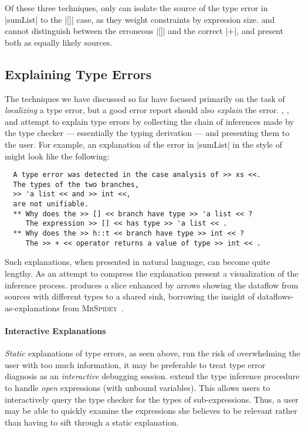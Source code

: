 Of these three techniques, only \citeauthor{Pavlinovic2014-mr} can
isolate the source of the type error in |sumList| to the |[]| case, as
they weight constraints by expression size.
%
\citeauthor{Zhang2015-yu} and \citeauthor{Loncaric2016-uk} cannot
distinguish between the erroneous |[]| and the correct |+|, and present
both as equally likely sources.


\subsection{Explaining Type Errors}
\label{sec:explaining-type-errors}
The techniques we have discussed so far have focused primarily on the
task of \emph{localizing} a type error, but a good error report should
also \emph{explain} the error.
%
\citet{Wand1986-nw}, \citet{Beaven1993-hb}, and \citet{Duggan1996-by}
attempt to explain type errors by collecting the chain of inferences
made by the type checker --- essentially the typing derivation ---
and presenting them to the user.
%
For example, an explanation of the error in |sumList| in the style of
\citeauthor{Beaven1993-hb} might look like the following:
%
\begin{verbatim}
  A type error was detected in the case analysis of >> xs <<.
  The types of the two branches,
  >> 'a list << and >> int <<,
  are not unifiable.
  ** Why does the >> [] << branch have type >> 'a list << ?
     The expression >> [] << has type >> 'a list << .
  ** Why does the >> h::t << branch have type >> int << ?
     The >> + << operator returns a value of type >> int << .
\end{verbatim}
%
Such explanations, when presented in natural language, can become quite
lengthy.
%
As an attempt to compress the explanation \citet{Yang2000-kz} present a
visualization of the inference process.
%
\citet{Gast2004-zd} produces a slice enhanced by arrows
showing the dataflow from sources with different types to a
shared sink, borrowing the insight of dataflows-as-explanations from
\textsc{MrSpidey}~\citep{Flanagan1996-bu}.

\paragraph{Interactive Explanations}
\emph{Static} explanations of type errors, as seen above, run the risk
of overwhelming the user with too much information, it may be preferable
to treat type error diagnosis as an \emph{interactive} debugging
session.
%
\citet{Bernstein1995-yj} extend the type inference procedure to handle
\emph{open} expressions (\ie with unbound variables).
%
This allows users to interactively query the type checker for the types
of sub-expressions.
%
Thus, a user may be able to quickly examine the expressions she believes
to be relevant rather than having to sift through a static explanation.

